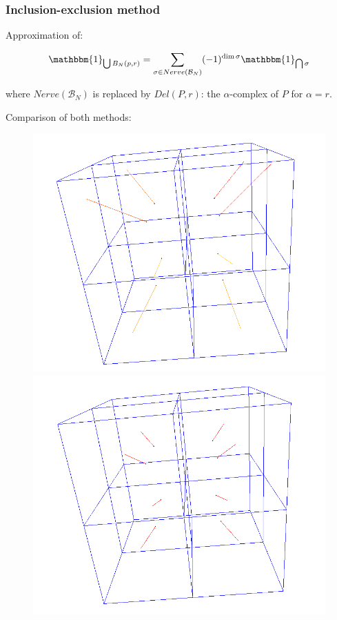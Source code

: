 \documentclass{beamer}
\newcommand{\indicator}[1]{\mathbbm{1}_{#1}}
\begin{document}
\begin{frame}
    \frametitle{Inclusion-exclusion method}

    Approximation of:

$$ \indicator{\bigcup B_N(p, r)} = \sum_{\sigma \in Nerve(\mathcal{B}_N)}
(-1)^{\dim \sigma} \indicator{\bigcap \sigma} $$

    where $ Nerve(\mathcal{B}_N) $ is replaced by $ Del(P, r) $: the
    $\alpha$-complex of $ P $ for $ \alpha = r $.

    Comparison of both methods:
    \begin{figure}
        \centering
        \includegraphics[scale=0.15]{img/cube-cube-15-naive}
        \includegraphics[scale=0.15]{img/cube-cube-15-ie}
    \end{figure}
\end{frame}
\end{document}
